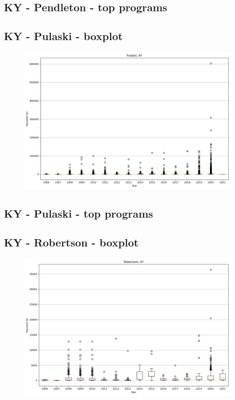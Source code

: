 \subsection*{KY - Pendleton - top programs}

\newpage
\subsection*{KY - Pulaski - boxplot}
\begin{figure}[h]
\centering
\includegraphics[width=7in]{../output/boxplots/counties/Pulaski-KY_boxplot.png}
\end{figure}


\subsection*{KY - Pulaski - top programs}

\newpage
\subsection*{KY - Robertson - boxplot}
\begin{figure}[h]
\centering
\includegraphics[width=7in]{../output/boxplots/counties/Robertson-KY_boxplot.png}
\end{figure}


